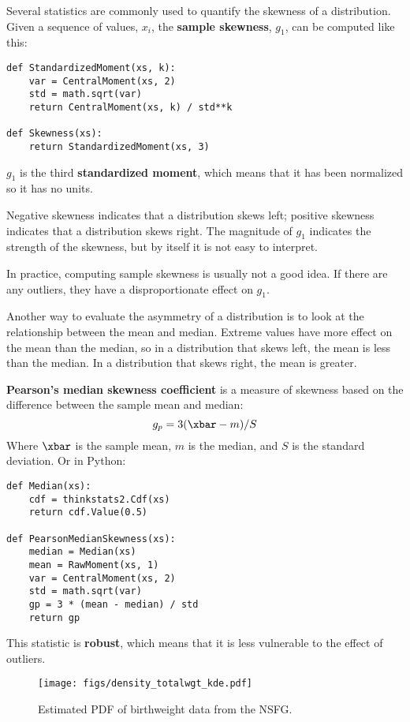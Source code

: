 \documentclass[12pt]{book}
\begin{document}
Several statistics are commonly used to quantify the skewness of a
distribution.  Given a sequence of values, $x_i$, the {\bf sample
  skewness}, $g_1$, can be computed like this:

\begin{verbatim}
def StandardizedMoment(xs, k):
    var = CentralMoment(xs, 2)
    std = math.sqrt(var)
    return CentralMoment(xs, k) / std**k

def Skewness(xs):
    return StandardizedMoment(xs, 3)
\end{verbatim}

$g_1$ is the third {\bf standardized moment}, which means that it has
been normalized so it has no units.

Negative skewness indicates that a distribution 
skews left; positive skewness indicates
that a distribution skews right.  The magnitude of $g_1$ indicates
the strength of the skewness, but by itself it is not easy to
interpret.

In practice, computing sample skewness is usually not
a good idea.  If there are any outliers, they
have a disproportionate effect on $g_1$.

Another way to evaluate the asymmetry of a distribution is to look
at the relationship between the mean and median.
Extreme values have more effect on the mean than the median, so
in a distribution that skews left, the mean is less than the median.
In a distribution that skews right, the mean is greater.

{\bf Pearson's median skewness coefficient} is a measure
of skewness based on the difference between the
sample mean and median:
%
\[ g_p = 3 (\xbar - m) / S \]
%
Where $\xbar$ is the sample mean, $m$ is the median, and
$S$ is the standard deviation.  Or in Python:

\begin{verbatim}
def Median(xs):
    cdf = thinkstats2.Cdf(xs)
    return cdf.Value(0.5)

def PearsonMedianSkewness(xs):
    median = Median(xs)
    mean = RawMoment(xs, 1)
    var = CentralMoment(xs, 2)
    std = math.sqrt(var)
    gp = 3 * (mean - median) / std
    return gp
\end{verbatim}

This statistic is {\bf robust}, which means that it is less vulnerable
to the effect of outliers.

\begin{figure}
\centerline{\texttt{[image: figs/density\_totalwgt\_kde.pdf]}}
\caption{Estimated PDF of birthweight data from the NSFG.}
\label{density_totalwgt_kde}
\end{figure}
\end{document}
